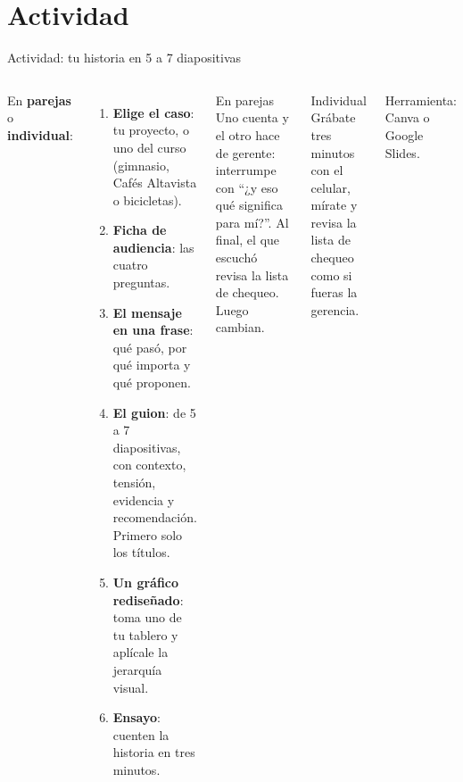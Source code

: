 \documentclass[aspectratio=169,11pt]{beamer}
\begin{document}
\section{Actividad}
\begin{frame}[t]{Actividad: tu historia en 5 a 7 diapositivas}
  \begin{columns}[T,onlytextwidth]
    \small En \textbf{parejas} o \textbf{individual}:
    \begin{enumerate}
      \footnotesize
      \item \textbf{Elige el caso}: tu proyecto, o uno del curso
        (gimnasio, Cafés Altavista o bicicletas).
      \item \textbf{Ficha de audiencia}: las cuatro preguntas.
      \item \textbf{El mensaje en una frase}: qué pasó, por qué importa y
        qué proponen.
      \item \textbf{El guion}: de 5 a 7 diapositivas, con contexto,
        tensión, evidencia y recomendación. Primero solo los títulos.
      \item \textbf{Un gráfico rediseñado}: toma uno de tu tablero y
        aplícale la jerarquía visual.
      \item \textbf{Ensayo}: cuenten la historia en tres minutos.
    \end{enumerate}
    \begin{block}{En parejas}
      \footnotesize Uno cuenta y el otro hace de gerente: interrumpe con
      ``¿y eso qué significa para mí?''. Al final, el que escuchó revisa la
      lista de chequeo. Luego cambian.
    \end{block}
    \begin{block}{Individual}
      \footnotesize Grábate tres minutos con el celular, mírate y revisa la
      lista de chequeo como si fueras la gerencia.
    \end{block}
    \footnotesize Herramienta: Canva o Google Slides.
  \end{columns}
\end{frame}
\end{document}
